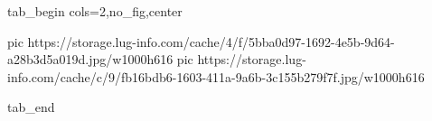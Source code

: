  
 
 
 
 


\ifcmt
  tab_begin cols=2,no_fig,center

     pic https://storage.lug-info.com/cache/4/f/5bba0d97-1692-4e5b-9d64-a28b3d5a019d.jpg/w1000h616
     pic https://storage.lug-info.com/cache/c/9/fb16bdb6-1603-411a-9a6b-3c155b279f7f.jpg/w1000h616

  tab_end
\fi
